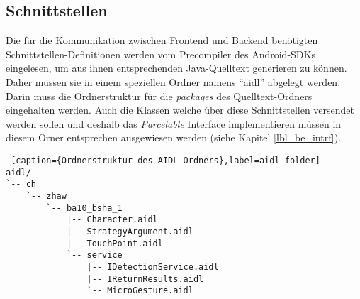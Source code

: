 \subsection{Schnittstellen}

Die für die Kommunikation zwischen Frontend und Backend benötigten Schnittstellen-Definitionen werden vom Precompiler des Android-SDKs eingelesen, um aus ihnen entsprechenden Java-Quelltext generieren zu können. Daher müssen sie in einem speziellen Ordner namens ``aidl'' abgelegt werden. Darin muss die Ordnerstruktur für die \emph{packages} des Quelltext-Ordners eingehalten werden. Auch die Klassen welche über diese Schnittstellen versendet werden sollen und deshalb das \emph{Parcelable} Interface implementieren müssen in diesem Orner entsprechen ausgewiesen werden (siehe Kapitel \ref{lbl_be_intrf}).

\begin{lstlisting} [caption={Ordnerstruktur des AIDL-Ordners},label=aidl_folder]
aidl/
`-- ch
    `-- zhaw
        `-- ba10_bsha_1
            |-- Character.aidl
            |-- StrategyArgument.aidl
            |-- TouchPoint.aidl
            `-- service
                |-- IDetectionService.aidl
                |-- IReturnResults.aidl
                `-- MicroGesture.aidl
\end{lstlisting}
